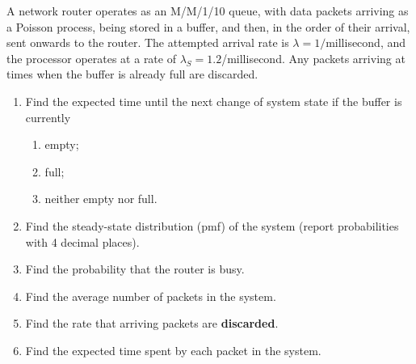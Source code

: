   \item A network router operates as an M/M/1/10 queue, with data packets arriving as
    a Poisson process, being stored in a buffer, and then, in the order of their arrival, sent onwards
    to the router. The attempted arrival rate is $\lambda= 1/$millisecond, and the processor operates at a rate of $\lambda_S = 1.2$/millisecond. Any packets arriving at times when the buffer is already full are discarded.
    \begin{enumerate}
      \item Find the expected time until the next change of system state if the buffer is currently
        \begin{enumerate}
          \item empty;
          \item full;
          \item neither empty nor full.
        \end{enumerate}
      \item Find the steady-state distribution (pmf) of the system
        (report probabilities with 4 decimal places).
      \item Find the probability that the router is busy.
      \item Find the average number of packets in the system.
      \item Find the rate that arriving packets are {\bf discarded}. 
      \item Find the expected time spent by each packet in the system.
    \end{enumerate}
